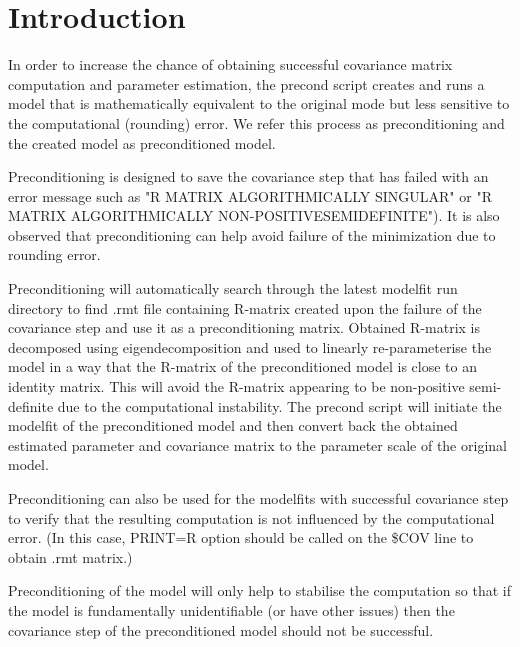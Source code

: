 
\usepackage{color}
\usepackage{amsmath}



\maketitle

\section{Introduction}
In order to increase the chance of obtaining successful covariance matrix computation and parameter estimation, the precond script creates and runs a model that is mathematically equivalent to the original mode but less sensitive to the computational (rounding) error.  We refer this process as preconditioning and the created model as preconditioned model.

Preconditioning is designed to save the covariance step that has failed with an error message such as "R MATRIX ALGORITHMICALLY SINGULAR" or "R MATRIX ALGORITHMICALLY NON-POSITIVESEMIDEFINITE"). It is also observed that preconditioning can help avoid failure of the minimization due to rounding error.

Preconditioning will automatically search through the latest modelfit run directory to find .rmt file containing R-matrix created upon the failure of the covariance step and use it as a preconditioning matrix.  Obtained R-matrix is decomposed using eigendecomposition and used to linearly re-parameterise the model in a way that the R-matrix of the preconditioned model is close to an identity matrix.  This will avoid the R-matrix appearing to be non-positive semi-definite due to the computational instability.  The precond script will initiate the modelfit of the preconditioned model and then convert back the obtained estimated parameter and covariance matrix to the parameter scale of the original model.

Preconditioning can also be used for the modelfits with successful covariance step to verify that the resulting computation is not influenced by the computational error.  (In this case, PRINT=R option should be called on the \$COV line to obtain .rmt matrix.)

Preconditioning of the model will only help to stabilise the computation so that if the model is fundamentally unidentifiable (or have other issues) then the covariance step of the preconditioned model should not be successful.

